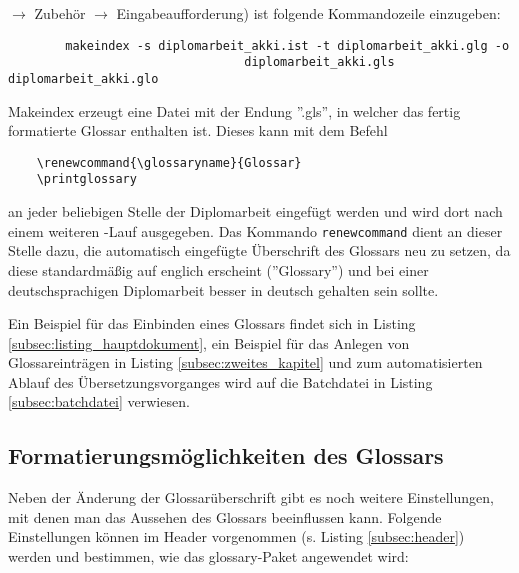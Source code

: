 $\rightarrow$ Zubehör $\rightarrow$ Eingabeaufforderung) ist folgende Kommandozeile einzugeben:
\begin{verbatim}
		makeindex -s diplomarbeit_akki.ist -t diplomarbeit_akki.glg -o
								 diplomarbeit_akki.gls diplomarbeit_akki.glo
\end{verbatim}
Makeindex erzeugt eine Datei mit der Endung ''.gls'', in welcher das fertig formatierte Glossar
enthalten ist. Dieses kann mit dem Befehl
\begin{verbatim}
	\renewcommand{\glossaryname}{Glossar}
	\printglossary
\end{verbatim}
an jeder beliebigen Stelle der Diplomarbeit eingefügt werden und wird dort nach einem weiteren
\DMLLaTeX-Lauf ausgegeben. Das Kommando \texttt{renewcommand} dient an dieser Stelle dazu, die
automatisch eingefügte Überschrift des Glossars neu zu setzen, da diese standardmäßig auf
englich erscheint (''Glossary'') und bei einer deutschsprachigen Diplomarbeit besser in deutsch
gehalten sein sollte.

Ein Beispiel für das Einbinden eines Glossars findet sich in Listing
\ref{subsec:listing_hauptdokument}, ein Beispiel für das Anlegen von Glossareinträgen in Listing
\ref{subsec:zweites_kapitel} und zum automatisierten Ablauf des Übersetzungsvorganges wird auf
die Batchdatei in Listing \ref{subsec:batchdatei} verwiesen.

\subsection{Formatierungsmöglichkeiten des Glossars}
Neben der Änderung der Glossarüberschrift gibt es noch weitere Einstellungen, mit denen man das
Aussehen des Glossars beeinflussen kann. Folgende Einstellungen können im Header vorgenommen
(s. Listing \ref{subsec:header}) werden und bestimmen, wie das glossary-Paket angewendet wird:

